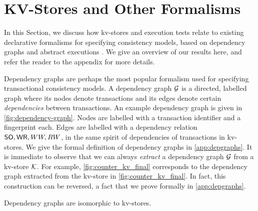 \section{KV-Stores and Other Formalisms}
\label{sec:other_formalisms}

In this Section, we discuss how kv-stores and execution 
tests relate to existing declarative formalisms for specifying  
consistency models, based on dependency graphs \cite{adya} 
and abstract executions \cite{framework-concur}. 
We give an overview of our results here, and refer the reader to the 
appendix for more details.


Dependency graphs \cite{adya-icde,adya} are perhaps the most popular 
formalism used for specifying transactional consistency models. 
A dependency graph $\mathcal{G}$ is a directed, labelled graph where its
nodes denote transactions and its edges denote certain \emph{dependencies} between transactions.  
An example dependency graph is given in \cref{fig:dependency-graph}.
Nodes are labelled with a transaction identifier and a fingerprint each.
Edges are labelled with a dependency relation $\mathsf{SO}, \mathsf{WR}, WW, RW$, in the 
same spirit of dependencies of transactions in kv-stores.
%
We give the formal definition of dependency graphs in \cref{app:depgraphs}.
It is immediate to observe that we can always \emph{extract} a dependency graph  $\mathcal{G}$ from a kv-store $\mathcal{K}$.
For example, \cref{fig:counter_kv_final} corresponds to the dependency graph extracted from the kv-store in \cref{fig:counter_kv_final}.
In fact, this construction can be reversed, a fact that we prove formally in \cref{app:depgraphs}.
\begin{theorem}
\label{thm:kv_graph_isomorph}
Dependency graphs are isomorphic to kv-stores.
\end{theorem}

